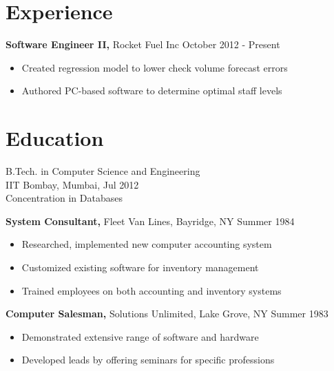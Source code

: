 \documentclass[margin]{res}
\begin{document}

\address{ \href{http://ankush.io/}{http://ankush.io} }
\address{ ankush@ankush.io }

\begin{resume}



\section{Experience}
 {\bf Software Engineer II,} Rocket Fuel Inc \hfill October 2012 - Present
 \begin{itemize} \itemsep -2pt  %
 \item Created regression model to lower check volume
                 forecast errors
 \item Authored PC-based software to determine optimal
                 staff levels
 \end{itemize}

\section{Education}
B.Tech. in Computer Science and Engineering \\
IIT Bombay, Mumbai, Jul 2012 \\
Concentration in Databases



{\bf System Consultant,} Fleet Van Lines, Bayridge, NY \hfill  Summer 1984
\begin{itemize} \itemsep -2pt %
\item Researched, implemented new computer accounting
                 system
\item Customized existing software for inventory
                 management
\item Trained employees on both accounting and inventory
                 systems
\end{itemize}

{\bf Computer Salesman,} Solutions Unlimited, Lake Grove, NY \hfill
Summer 1983
                \begin{itemize} \itemsep -2pt
                 \item  Demonstrated extensive range of software and
                 hardware

                 \item Developed leads by offering seminars for specific
                 professions


\end{itemize}
\end{resume}
\end{document}
